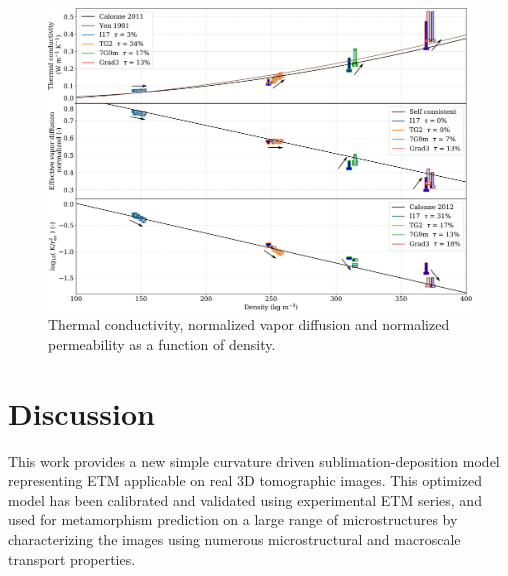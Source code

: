 \documentclass[draft,ms]{agujournal2019}
\begin{document}
\begin{figure}
    \centering
    \includegraphics[width=\linewidth]{Figures/Tplot_tau_rhos.pdf}
    \caption{Thermal conductivity, normalized vapor diffusion and normalized permeability as a function of density.}
    \label{fig:Tplot}
\end{figure}


\section{Discussion}
\label{sec:disc}

This work provides a new simple curvature driven sublimation-deposition model representing ETM applicable on real 3D tomographic images. This optimized model has been calibrated and validated using experimental ETM series, and used for metamorphism prediction on a large range of microstructures by characterizing the images using numerous microstructural and macroscale transport properties.

\end{document}
